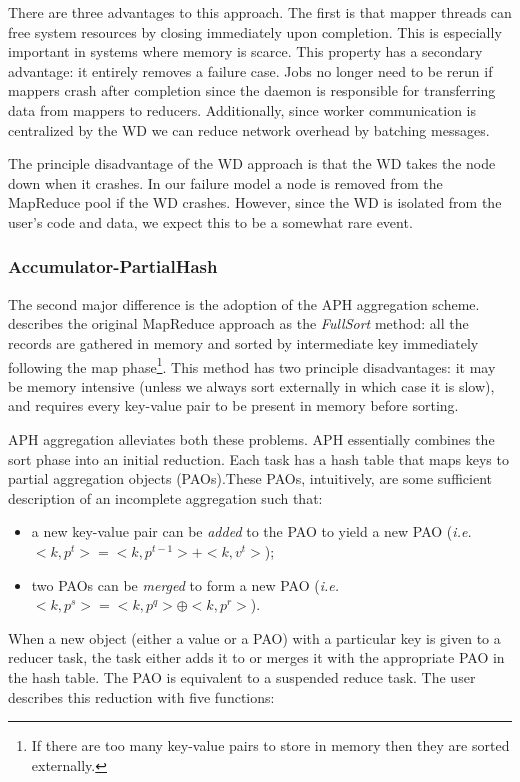 \documentclass[10pt,letter,final,article,twocolumn]{article} %
\begin{document}
There are three advantages to this approach. The first is that mapper threads can free system resources by closing immediately upon completion. This is especially important in systems where memory is scarce. This property has a secondary advantage: it entirely removes a failure case. Jobs no longer need to be rerun if mappers crash after completion since the daemon is responsible for transferring data from mappers to reducers. Additionally, since worker communication is centralized by the WD we can reduce network overhead by batching messages.

The principle disadvantage of the WD approach is that the WD takes the node down when it crashes. In our failure model a node is removed from the MapReduce pool if the WD crashes. However, since the WD is isolated from the user's code and data, we expect this to be a somewhat rare event.

\subsubsection{Accumulator-PartialHash}

The second major difference is the adoption of the APH aggregation scheme. \citet{yu2009distributed} describes the original MapReduce approach as the \emph{FullSort} method: all the records are gathered in memory and sorted by intermediate key immediately following the map phase\footnote{If there are too many key-value pairs to store in memory then they are sorted externally.}. This method has two principle disadvantages: it may be memory intensive (unless we always sort externally in which case it is slow), and requires every key-value pair to be present in memory before sorting. 

 APH aggregation alleviates both these problems. APH essentially combines the sort phase into an initial reduction. Each task has a hash table that maps keys to partial aggregation objects (PAOs).These PAOs, intuitively, are some sufficient description of an incomplete aggregation such that:
\begin{itemize}
 \item a new key-value pair can be \emph{added} to the PAO to yield a new PAO (\emph{i.e.} $<k,p^t> = <k,p^{t-1}> + <k,v^t>$);
 \item two PAOs can be \emph{merged} to form a new PAO (\emph{i.e.} $<k,p^s> = <k,p^q> \oplus <k,p^r>$).
\end{itemize}
When a new object (either a value or a PAO) with a particular key is given to a reducer task, the task either adds it to or merges it with the appropriate PAO in the hash table. The PAO is equivalent to a suspended reduce task. The user describes this reduction with five functions:
\end{document}
